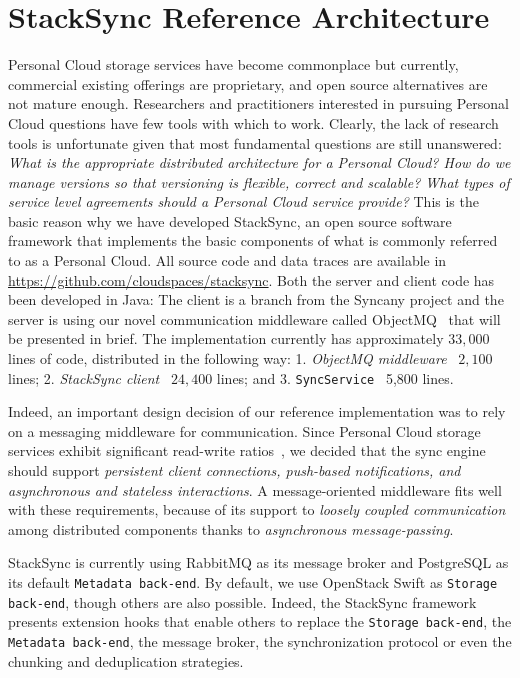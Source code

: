 \chapter{StackSync Reference Architecture}

Personal Cloud storage services have become commonplace but currently, 
commercial existing offerings are proprietary, and open source alternatives
are not mature enough. Researchers and practitioners interested in
pursuing Personal Cloud questions have few tools with which to work. 
Clearly, the lack of research tools is unfortunate given that most
fundamental questions are still unanswered: \textit{What is the appropriate
distributed architecture for a Personal Cloud? How do we manage versions
so that versioning is flexible, correct and scalable? What types of service level
agreements should a Personal Cloud service provide?} This is the basic 
reason why we have developed StackSync, an open source software framework
that implements the basic components of what is commonly referred to as a Personal Cloud.
All source code and data traces are available in \url{https://github.com/cloudspaces/stacksync}. 
Both the server and client code has been developed in Java:  The client is a branch from
the Syncany \cite{syncany} project and the server is using our novel communication middleware called
ObjectMQ~\cite{omq} that will be presented in brief. The implementation currently has approximately
$33,000$ lines of code, distributed in the following way: 1. \textit{ObjectMQ middleware} \textemdash~$2,100$ lines; 
2. \textit{StackSync client} \textemdash~$24,400$ lines; and
3. \texttt{SyncService} \textemdash~5,800 lines.

Indeed, an important design decision of our reference implementation was to rely on a messaging middleware for communication. 
Since Personal Cloud storage services exhibit significant read-write ratios~\cite{Dropbox}, we decided that the sync
engine should support \textit{persistent client connections, push-based notifications, and asynchronous and stateless interactions}.
A message-oriented middleware fits well with these requirements, because of its support to \textit{loosely coupled communication}
among distributed components thanks to \textit{asynchronous message-passing}.

StackSync is currently using RabbitMQ as its message broker and PostgreSQL as its default \texttt{Metadata back-end}. By default, 
we use OpenStack Swift as \texttt{Storage back-end}, though others are also possible. Indeed, the StackSync framework presents extension
hooks that enable others to replace the \texttt{Storage back-end}, the \texttt{Metadata back-end}, the message broker, 
the synchronization protocol or even the chunking and deduplication strategies.



